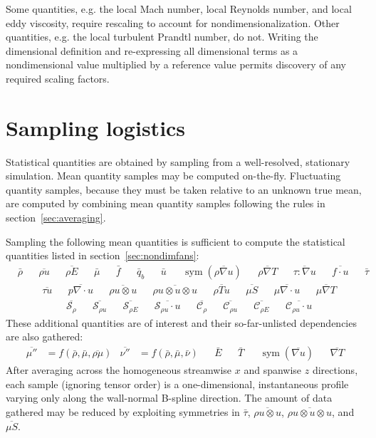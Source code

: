 \documentclass[letterpaper,11pt,nointlimits,reqno,draft]{amsbook}
\newcommand{\symmetricpart}[1]
  {\ensuremath{\operatorname{sym}\left(#1\right)}}
\newcommand{\Ssd}{\ensuremath{\mathcal{S}}} %
\newcommand{\Cs}{\ensuremath{\mathcal{C}}}  %
\begin{document}
Some quantities, e.g. the local Mach number, local Reynolds number, and local
eddy viscosity, require rescaling to account for nondimensionalization.  Other
quantities, e.g. the local turbulent Prandtl number, do not.  Writing the
dimensional definition and re-expressing all dimensional terms as a
nondimensional value multiplied by a reference value permits discovery of any
required scaling factors.

\section{Sampling logistics}
\label{sec:sampling}

Statistical quantities are obtained by sampling from a well-resolved,
stationary simulation.  Mean quantity samples may be computed on-the-fly.
Fluctuating quantity samples, because they must be taken relative to an unknown
true mean, are computed by combining mean quantity samples following the rules
in section~\ref{sec:averaging}.

Sampling the following mean quantities is sufficient to compute
the statistical quantities listed in section~\ref{sec:nondimfans}:
\begin{align}
&\bar{\rho}
&
&\overline{\rho{}u}
&
&\overline{\rho{}E}
&
&\bar{\mu}
&
&\bar{f}
&
&\bar{q}_b
&
&\bar{u}
&
&\symmetricpart{\overline{\rho\nabla{}u}}
&
&\overline{\rho\nabla{}T}
&
&\overline{\tau:\nabla{}u}
&
&\overline{f\cdot{}u}
&
&\bar{\tau}
\end{align}
\begin{align}
&\overline{\tau{}u}
&
&\overline{p\nabla\cdot{}u}
&
&\overline{\rho{}u\otimes{}u}
&
&\overline{\rho{}u\otimes{}u\otimes{}u}
&
&\overline{\rho{}Tu}
&
&\overline{\mu{}S}
&
&\overline{\mu\nabla\cdot{}u}
&
&\overline{\mu\nabla{}T}
\end{align}
\begin{align}
&\overline{\Ssd_{\rho{}}}
&
&\overline{\Ssd_{\rho{} u}}
&
&\overline{\Ssd_{\rho{} E}}
&
&\overline{\Ssd_{\rho{} u}\cdot{}u}
&
&\overline{\Cs_{\rho{}}}
&
&\overline{\Cs_{\rho{} u}}
&
&\overline{\Cs_{\rho{} E}}
&
&\overline{\Cs_{\rho{} u}\cdot{}u}
\end{align}
These additional quantities are of interest and their so-far-unlisted
dependencies are also gathered:
\begin{align}
  \overline{\mu{}''}&= f\left(
      \bar{\rho}, \bar{\mu}, \overline{\rho\mu}
  \right)
  &
  \overline{\nu{}''} &= f\left(
      \bar{\rho}, \bar{\mu}, \bar{\nu}
  \right)
  &
  &\bar{E}
  &
  &\bar{T}
  &
  &\symmetricpart{\overline{\nabla{}u}}
  &
  &\overline{\nabla{}T}
\end{align}
After averaging across the homogeneous streamwise $x$ and spanwise $z$
directions, each sample (ignoring tensor order) is a one-dimensional,
instantaneous profile varying only along the wall-normal B-spline direction.
The amount of data gathered may be reduced by exploiting symmetries in
$\bar{\tau}$, $\overline{\rho{}u\otimes{}u}$,
$\overline{\rho{}u\otimes{}u\otimes{}u}$, and $\overline{\mu{}S}$.
\end{document}
